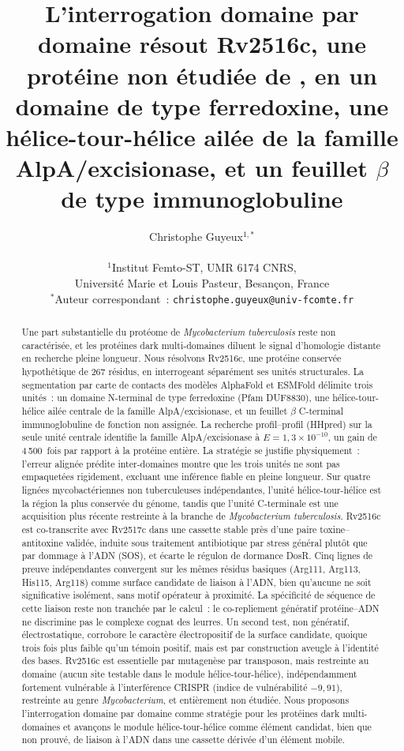 \documentclass[11pt,a4paper]{article}
\title{L'interrogation domaine par domaine résout Rv2516c, une protéine non étudiée de \mtb{},
  en un domaine de type ferredoxine, une hélice-tour-hélice ailée de la famille AlpA/excisionase,
  et un feuillet $\beta$ de type immunoglobuline}
\author{Christophe Guyeux$^{1,*}$\\[6pt]
  \parbox{\textwidth}{\centering\small
    $^{1}$Institut Femto-ST, UMR 6174 CNRS,\\
    Universit\'e Marie et Louis Pasteur, Besan\c{c}on, France\\[3pt]
    $^{*}$Auteur correspondant~: \texttt{christophe.guyeux@univ-fcomte.fr}
  }
}
\date{}
\newcommand{\mtb}{\textit{Mycobacterium tuberculosis}}
\begin{document}
\linenumbers
\maketitle

\begin{abstract}
\noindent
Une part substantielle du protéome de \mtb{} reste non caractérisée, et les
protéines dark multi-domaines diluent le signal d'homologie distante en recherche pleine longueur.
Nous résolvons Rv2516c, une protéine conservée hypothétique de 267 résidus, en interrogeant
séparément ses unités structurales. La segmentation par
carte de contacts des modèles AlphaFold et ESMFold délimite trois unités~: un domaine N-terminal de
type ferredoxine (Pfam DUF8830), une hélice-tour-hélice ailée centrale de la famille
AlpA/excisionase, et un feuillet $\beta$ C-terminal immunoglobuline de fonction non assignée. La
recherche profil--profil (HHpred) sur la seule unité centrale identifie la famille AlpA/excisionase
à $E=1,3\times10^{-10}$, un gain de 4\,500~fois par rapport à la protéine entière. La stratégie se
justifie physiquement~: l'erreur alignée prédite inter-domaines montre que les trois unités
ne sont pas empaquetées rigidement, excluant une inférence fiable en pleine longueur. Sur quatre
lignées mycobactériennes non tuberculeuses indépendantes, l'unité hélice-tour-hélice est la région
la plus conservée du génome, tandis que l'unité C-terminale est une acquisition plus récente
restreinte à la branche de \mtb{}. Rv2516c est co-transcrite avec Rv2517c dans une cassette stable
près d'une paire toxine--antitoxine validée, induite sous traitement antibiotique par stress
général plutôt que par dommage à l'ADN (SOS), et écarte le régulon de dormance
DosR. Cinq lignes de preuve indépendantes convergent sur
les mêmes résidus basiques (Arg111, Arg113, His115, Arg118) comme surface candidate de liaison à
l'ADN, bien qu'aucune ne soit significative isolément, sans motif opérateur à proximité. La
spécificité de séquence de cette liaison reste non tranchée par le calcul~: le
co-repliement génératif protéine--ADN ne discrimine pas le complexe cognat des leurres. Un second
test, non génératif, électrostatique, corrobore le caractère électropositif de la surface
candidate, quoique trois fois plus faible qu'un témoin positif, mais est par construction aveugle
à l'identité des bases. Rv2516c est essentielle par mutagenèse par transposon, mais restreinte au domaine
(aucun site testable dans le module hélice-tour-hélice), indépendamment fortement
vulnérable à l'interférence CRISPR (indice de vulnérabilité $-9,91$), restreinte au genre
\textit{Mycobacterium}, et entièrement non étudiée. Nous proposons l'interrogation domaine par
domaine comme stratégie pour les protéines dark multi-domaines et avançons le module
hélice-tour-hélice comme élément candidat, bien que non prouvé, de liaison à l'ADN dans
une cassette dérivée d'un élément mobile.
\end{abstract}
\end{document}
